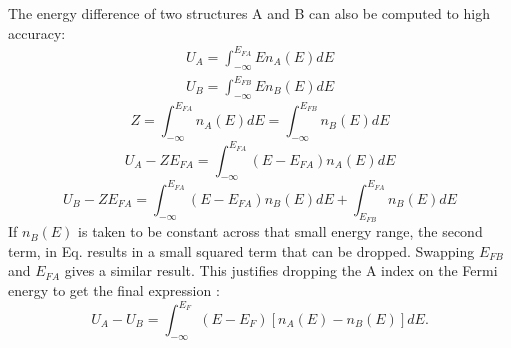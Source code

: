 The energy difference of two structures A and B can also be computed
to high accuracy:
%
\begin{eqnarray}
\label{eq:Ua}
U_{A} = \int_{-\infty}^{E_{FA}} E n_{A}(E) dE
\end{eqnarray}
%
\begin{eqnarray}
\label{eq:Ub}
U_{B} = \int_{-\infty}^{E_{FB}} E n_{B}(E) dE
\end{eqnarray}
%
\begin{equation}
\label{eq:totaldos}
Z = \int_{-\infty}^{E_{FA}} n_{A}(E)dE = \int_{-\infty}^{E_{FB}}n_{B}(E)dE
\end{equation}
%
\begin{equation}
U_{A}-ZE_{FA}= \int_{-\infty}^{E_{FA}}(E-E_{FA})n_{A}(E)dE
\end{equation}
%
\begin{equation}
U_{B}-ZE_{FA}= \int_{-\infty}^{E_{FA}}(E-E_{FA})n_{B}(E)dE + \int_{E_{FB}}^{E_{FA}}n_{B}(E)dE
\end{equation}
%
If $n_{B}(E)$ is taken to be constant across that small energy range, the second term, in
Eq. results in a small squared term that can be dropped. Swapping $E_{FB}$ and $E_{FA}$ gives
a similar result. This justifies dropping the A index on the Fermi energy to get the
final expression \cite{johannes76}:
%
\begin{equation}
U_{A}-U_{B} = \int_{-\infty}^{E_{F}}(E-E_{F})[n_{A}(E) -n_{B}(E)]dE.
\end{equation}
%


